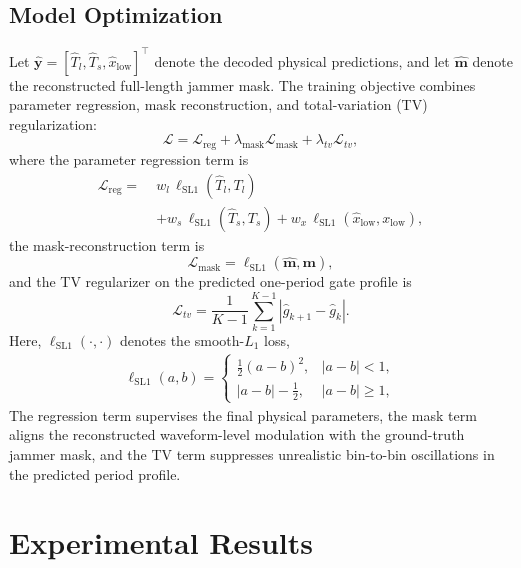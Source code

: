 \documentclass[conference]{IEEEtran}
\begin{document}
\subsection{Model Optimization}
Let $\hat{\mathbf{y}}=[\hat{T}_l,\hat{T}_s,\hat{x}_{\text{low}}]^\top$ denote the decoded physical predictions, and let $\hat{\mathbf{m}}$ denote the reconstructed full-length jammer mask. The training objective combines parameter regression, mask reconstruction, and total-variation (TV) regularization:
\begin{equation}
\mathcal{L}=\mathcal{L}_{\text{reg}} + \lambda_{\text{mask}} \mathcal{L}_{\text{mask}} + \lambda_{tv} \mathcal{L}_{tv},
\end{equation}
where the parameter regression term is
\begin{equation}
\begin{aligned}
\mathcal{L}_{\text{reg}}=\;&w_l\,\ell_{\mathrm{SL1}}(\hat{T}_l,T_l) \\
&+ w_s\,\ell_{\mathrm{SL1}}(\hat{T}_s,T_s)
+ w_x\,\ell_{\mathrm{SL1}}(\hat{x}_{\text{low}},x_{\text{low}}),
\end{aligned}
\end{equation}
the mask-reconstruction term is
\begin{equation}
\mathcal{L}_{\text{mask}}
=
\ell_{\mathrm{SL1}}(\hat{\mathbf{m}},\mathbf{m}),
\end{equation}
and the TV regularizer on the predicted one-period gate profile is
\begin{equation}
\mathcal{L}_{tv}
=
\frac{1}{K-1}
\sum_{k=1}^{K-1}
\left|\hat{g}_{k+1}-\hat{g}_{k}\right|.
\end{equation}
Here, $\ell_{\mathrm{SL1}}(\cdot,\cdot)$ denotes the smooth-$L_1$ loss,
\begin{equation}
\begin{aligned}
\ell_{\mathrm{SL1}}(a,b)
=
\begin{cases}
\frac{1}{2}(a-b)^2, & |a-b|<1,\\
|a-b|-\frac{1}{2}, & |a-b|\ge 1,
\end{cases}
\end{aligned}
\end{equation}
The regression term supervises the final physical parameters, the mask term aligns the reconstructed waveform-level modulation with the ground-truth jammer mask, and the TV term suppresses unrealistic bin-to-bin oscillations in the predicted period profile.

\section{Experimental Results}
\end{document}
